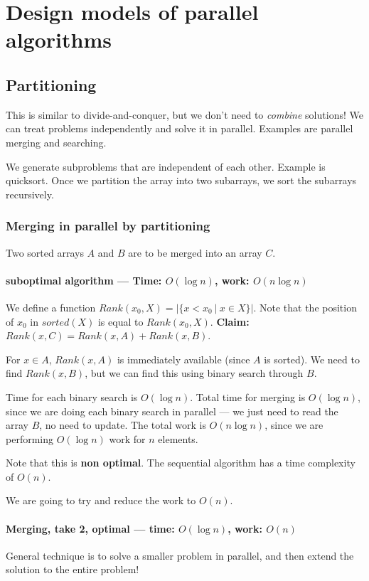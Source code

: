 \chapter{Design models of parallel algorithms}

\section{Partitioning}
This is similar to divide-and-conquer, but we don't need to \textit{combine}
solutions! We can treat problems independently and solve it in parallel.
Examples are parallel merging and searching.

We generate subproblems that are independent of each other.
Example is quicksort. Once we partition the array into two subarrays,
we sort the subarrays recursively.

\subsection{Merging in parallel by partitioning}
Two sorted arrays $A$ and $B$ are to be merged into an array $C$.

\subsubsection{suboptimal algorithm --- Time: $O(\log n)$, work: $O(n \log n)$}

We define a function $Rank(x_0, X) = |\{ x < x_0~\vert~x \in X \}|$. Note
that the position of $x_0$ in $sorted(X)$ is equal to $Rank(x_0, X)$.
\textbf{Claim:} $Rank(x, C) = Rank(x, A) + Rank(x, B)$.


For $x \in A$, $Rank(x, A)$ is immediately available (since $A$ is sorted).
We need to find $Rank(x, B)$, but we can find this using binary search through $B$.


Time for each binary search is $O(\log n)$. Total time for merging is
$O(\log n)$, since we are doing each binary search in parallel --- we just need
to read the array $B$, no need to update. The total work is $O(n \log n)$, since
we are performing $O(\log n)$ work for $n$ elements.


Note that this is \textbf{non optimal}. The sequential algorithm has
a time complexity of $O(n)$.


We are going to try and reduce the work to $O(n)$. 

\subsubsection{Merging, take 2, optimal --- time: $O(\log n)$, work: $O(n)$}
General technique is to solve a smaller problem in parallel, and then
extend the solution to the entire problem!

